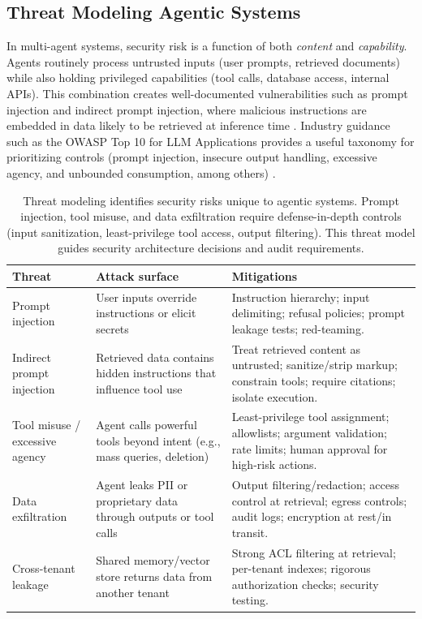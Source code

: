 \subsection{Threat Modeling Agentic Systems}
In multi-agent systems, security risk is a function of both \emph{content} and \emph{capability}.
Agents routinely process untrusted inputs (user prompts, retrieved documents) while also holding privileged capabilities (tool calls, database access, internal APIs).
This combination creates well-documented vulnerabilities such as prompt injection and indirect prompt injection, where malicious instructions are embedded in data likely to be retrieved at inference time \cite{Greshake2023IndirectPromptInjection}.
Industry guidance such as the OWASP Top 10 for LLM Applications provides a useful taxonomy for prioritizing controls (prompt injection, insecure output handling, excessive agency, and unbounded consumption, among others) \cite{OWASP2025LLMTop10}.

\begin{table}[t]
\centering
\small
\caption{Threat modeling identifies security risks unique to agentic systems. Prompt injection, tool misuse, and data exfiltration require defense-in-depth controls (input sanitization, least-privilege tool access, output filtering). This threat model guides security architecture decisions and audit requirements.}
\label{tab:ch09_agentic_threats}
\setlength{\tabcolsep}{6pt}
\renewcommand{\arraystretch}{1.3}
\begin{tabularx}{\linewidth}{@{}p{3.3cm}X X@{}}
\toprule
\rowcolor{gray!15}
\textbf{Threat} & \textbf{Attack surface} & \textbf{Mitigations} \\
\midrule
Prompt injection &
User inputs override instructions or elicit secrets &
Instruction hierarchy; input delimiting; refusal policies; prompt leakage tests; red-teaming. \\
Indirect prompt injection &
Retrieved data contains hidden instructions that influence tool use &
Treat retrieved content as untrusted; sanitize/strip markup; constrain tools; require citations; isolate execution. \\
Tool misuse / excessive agency &
Agent calls powerful tools beyond intent (e.g., mass queries, deletion) &
Least-privilege tool assignment; allowlists; argument validation; rate limits; human approval for high-risk actions. \\
Data exfiltration &
Agent leaks PII or proprietary data through outputs or tool calls &
Output filtering/redaction; access control at retrieval; egress controls; audit logs; encryption at rest/in transit. \\
Cross-tenant leakage &
Shared memory/vector store returns data from another tenant &
Strong ACL filtering at retrieval; per-tenant indexes; rigorous authorization checks; security testing. \\
\bottomrule
\end{tabularx}
\end{table}

